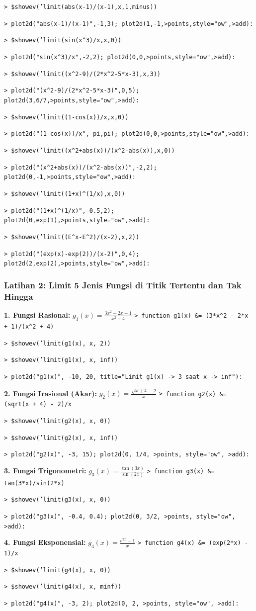 \documentclass[11pt, a4paper]{article}
\newcommand{\emtcmd}[1]{\noindent\texttt{\textcolor{emtcommand}{>}\ #1}\par\smallskip}
\begin{document}
\emtcmd{\$showev('limit(abs(x-1)/(x-1),x,1,minus))}
\emtcmd{plot2d("abs(x-1)/(x-1)",-1,3); plot2d(1,-1,>points,style="ow",>add):}

\emtcmd{\$showev('limit(sin(x\^{}3)/x,x,0))}
\emtcmd{plot2d("sin(x\^{}3)/x",-2,2); plot2d(0,0,>points,style="ow",>add):}

\emtcmd{\$showev('limit((x\^{}2-9)/(2*x\^{}2-5*x-3),x,3))}
\emtcmd{plot2d("(x\^{}2-9)/(2*x\^{}2-5*x-3)",0,5); plot2d(3,6/7,>points,style="ow",>add):}

\emtcmd{\$showev('limit((1-cos(x))/x,x,0))}
\emtcmd{plot2d("(1-cos(x))/x",-pi,pi); plot2d(0,0,>points,style="ow",>add):}

\emtcmd{\$showev('limit((x\^{}2+abs(x))/(x\^{}2-abs(x)),x,0))}
\emtcmd{plot2d("(x\^{}2+abs(x))/(x\^{}2-abs(x))",-2,2); plot2d(0,-1,>points,style="ow",>add):}

\emtcmd{\$showev('limit((1+x)\^{}(1/x),x,0))}
\emtcmd{plot2d("(1+x)\^{}(1/x)",-0.5,2); plot2d(0,exp(1),>points,style="ow",>add):}

\emtcmd{\$showev('limit((E\^{}x-E\^{}2)/(x-2),x,2))}
\emtcmd{plot2d("(exp(x)-exp(2))/(x-2)",0,4); plot2d(2,exp(2),>points,style="ow",>add):}

\subsubsection*{Latihan 2: Limit 5 Jenis Fungsi di Titik Tertentu dan Tak Hingga}

\textbf{1. Fungsi Rasional:} $g_1(x) = \frac{3x^2 - 2x + 1}{x^2 + 4}$
\emtcmd{function g1(x) \&= (3*x\^{}2 - 2*x + 1)/(x\^{}2 + 4)}
\emtcmd{\$showev('limit(g1(x), x, 2))}
\emtcmd{\$showev('limit(g1(x), x, inf))}
\emtcmd{plot2d("g1(x)", -10, 20, title="Limit g1(x) -> 3 saat x -> inf"):}

\textbf{2. Fungsi Irasional (Akar):} $g_2(x) = \frac{\sqrt{x + 4} - 2}{x}$
\emtcmd{function g2(x) \&= (sqrt(x + 4) - 2)/x}
\emtcmd{\$showev('limit(g2(x), x, 0))}
\emtcmd{\$showev('limit(g2(x), x, inf))}
\emtcmd{plot2d("g2(x)", -3, 15); plot2d(0, 1/4, >points, style="ow", >add):}

\textbf{3. Fungsi Trigonometri:} $g_3(x) = \frac{\tan(3x)}{\sin(2x)}$
\emtcmd{function g3(x) \&= tan(3*x)/sin(2*x)}
\emtcmd{\$showev('limit(g3(x), x, 0))}
\emtcmd{plot2d("g3(x)", -0.4, 0.4); plot2d(0, 3/2, >points, style="ow", >add):}

\textbf{4. Fungsi Eksponensial:} $g_4(x) = \frac{e^{2x} - 1}{x}$
\emtcmd{function g4(x) \&= (exp(2*x) - 1)/x}
\emtcmd{\$showev('limit(g4(x), x, 0))}
\emtcmd{\$showev('limit(g4(x), x, minf))}
\emtcmd{plot2d("g4(x)", -3, 2); plot2d(0, 2, >points, style="ow", >add):}
\end{document}
